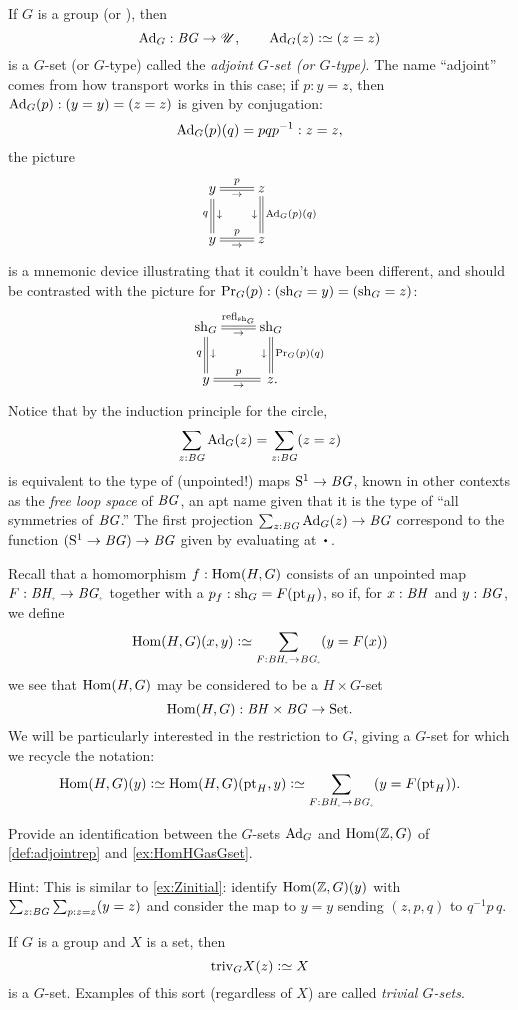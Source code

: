 \begin{example}\label{def:adjointrep}
  If $G$ is a group (or \inftygp), then
$$\Ad_G:\BG\to\UU,\qquad\Ad_G(z)\defequi(z=z)$$ is a $G$-set (or $G$-type) called the \emph{adjoint $G$-set (or $G$-type)}.  The name ``adjoint'' comes from how transport works in this case; if $p:y=z$, then $\Ad_G(p):(y=y)=(z=z)$ is given by conjugation: 
$$\Ad_G(p)(q)=pqp^{-1}:z=z,$$ the picture
$$\xymatrix{y\ar@{=}[r]^p_\to\ar@{=}[d]_q^\downarrow&z\ar@{=}[d]^{\Ad_G(p)(q)}_\downarrow\\
y\ar@{=}[r]^p_\to&z}$$
is a mnemonic device illustrating that it couldn't have been different, and should be contrasted with the picture for $\mathrm{Pr}_{{G}} (p):(\mathrm{sh}_G=y)=(\mathrm{sh}_G=z)$:
$$\xymatrix{\sh_G\ar@{=}[r]^{\refl{\sh_G}}_\to\ar@{=}[d]_q^\downarrow&\sh_G\ar@{=}[d]^{\princ G(p)(q)}_\downarrow\\
y\ar@{=}[r]^p_\to&\,z.}$$  
Notice that by the induction principle for the circle,
$$\sum_{z:\BG}\Ad_G(z)=\sum_{z:\BG}(z=z)$$
is equivalent to the type of (unpointed!) maps ${\mathrm{S}^1}\to\mathit{B}\mathit{G}$, known in other contexts as the \emph{free loop space} of $\mathit{B}\mathit{G}$, an apt name given that it is the type of ``all symmetries of $\mathit{B}\mathit{G}$.''  
The first projection $\sum_{z:\BG}\Ad_G(z)\to \BG$ correspond to the function $({\mathrm{S}^1}\to\mathit{B}\mathit{G})\to\mathit{B}\mathit{G}$ given by evaluating at $\base$. 
\end{example}
\begin{example}
  \label{ex:HomHGasGset}
  Recall that a homomorphism $f:\Hom(H,G)$ consists of an unpointed map $F:\BH_\div\to \BG_\div$ together with a $p_f:\mathrm{sh}_G=F(\mathrm{pt}_H)$, so if, for $x:\mathit{B}\mathit{H}$ and $y:\mathit{B}\mathit{G}$, we define
$$\Hom(H,G)(x,y)\defequi\sum_{F:\BH_\div\to \BG_\div}(y=F(x))$$
we see that $\Hom(H,G)$ may be considered to be a $H\times G$-set
$$\Hom(H,G) : \BH\times \BG\to\Set.$$
We will be particularly interested in the restriction to $G$, giving a $G$-set for which we recycle the notation: 
$$\Hom(H,G)(y)\defequi\Hom(H,G)(\pt_H,y)\defequi \sum_{F:\BH_\div\to \BG_\div}(y=F(\pt_H)).$$ 
\end{example}
\begin{xca}
  \label{xca:HomZGvsAdG}
  Provide an identification between the $G$-sets 
$\Ad_G$  and $\Hom(\ZZ,G)$ 
of \cref{def:adjointrep} and \cref{ex:HomHGasGset}.

Hint: This is similar to \cref{ex:Zinitial}: 
identify $\Hom(\ZZ,G)(y)$ with $\sum_{z:\mathit{B}\mathit{G}}\sum_{p:z=z}(y=z)$ and 
consider the map to $y=y$ sending $(z,p,q)$ to $q^{-1}p\,q$.
\end{xca}


\begin{example}\label{def:trivGset}
  If $G$ is a group and $X$ is a set, then
$$\mathrm{triv}_GX(z)\defequi X$$ is a $G$-set.  
Examples of this sort (regardless of $X$) are called \emph{trivial $G$-sets}.
\end{example}

